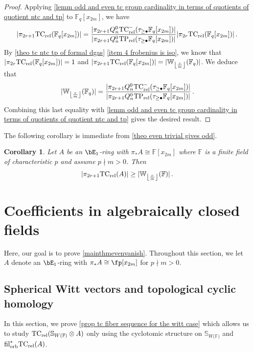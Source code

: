 \documentclass[english,10pt]{amsart}
\newcommand{\sphwf}{\mathbb{S}_{W(\mathbb{F)}}}
\newcommand{\rel}{\textup{rel}}
\newcommand{\field}{\mathbb{F}}
\newtheorem{coro}{Corollary}[section]
\theoremstyle{definition}
\numberwithin{equation}{section}
\newcommand{\rntc}{\mathrm{TC}_{\rel}^{-}}
\newcommand{\rtp}{\mathrm{TP}_{\rel}}
\newcommand{\rtc}{\mathrm{TC}_{\rel}}
\newcommand{\filorb}{\mathrm{fil}^{*}_{\textup{orb}}}
\newcommand{\pis}{\pi_*}
\DeclarePairedDelimiter\floor{\lfloor}{\rfloor}
\begin{document}
\theoeventrivialgivesodd*

\begin{proof}

 Applying \autoref{lemm odd and even tc group cardinality in terms of quotients of quotient ntc and tp} to $\field_{q}[x_{2m}]$, we have 
\[\lvert \pi_{2r+1}\rtc (\field_q[x_{2m}]) \rvert = \frac{\lvert \pi_{2r+1} Q_n^0 \rntc(\tau_{\geq \bullet} \field_q[x_{2m}]) \rvert}{\lvert \pi_{2r+1} Q_n^0 \rtp(\tau_{\geq \bullet} \field_q[x_{2m}]) \rvert} \lvert \pi_{2r} \rtc (\field_q[x_{2m}])\rvert \,.\]
By \autoref{theo tc ntc tp of formal dgas} \eqref{item 4 frobenius is iso}, we know that $\lvert \pi_{2r} \rtc (\field_q[x_{2m}])\rvert = 1$ and $\lvert \pi_{2r+ 1}\rtc (\field_q[x_{2m}]) \rvert  = \lvert \mathbb{W}_{\floor*{\frac{r}{m}}}(\field_q)\rvert$. We deduce that 
\[ \lvert \mathbb{W}_{\floor*{\frac{r}{m}}}(\field_q)\rvert=\frac{\lvert \pi_{2r+1} Q_n^0 \rntc(\tau_{\geq \bullet} \field_q[x_{2m}]) \rvert}{\lvert \pi_{2r+1} Q_n^0 \rtp(\tau_{\geq \bullet} \field_q[x_{2m}]) \rvert}\,.\]
Combining this last equality with \autoref{lemm odd and even tc group cardinality in terms of quotients of quotient ntc and tp} gives the desired result.

\end{proof}
The following corollary is immediate from \autoref{theo even trivial gives odd}.  
\begin{coro}
Let $A$ be an $\bE_1$-ring with $\pis A \cong \field[x_{2m}]$ where $\field$ is a finite field of characteristic $p$ and assume $p \nmid m>0$. Then 
\[ \lvert \pi_{2r+1}\rtc(A)\rvert \ge  \lvert \mathbb{W}_{\floor*{\frac{r}{m}}}(\field) \rvert  \,.
\]
\end{coro}

\section{Coefficients in algebraically closed fields}

Here, our goal is to prove \autoref{mainthmevenvanish}. Throughout this section, we let  $A$ denote an $\bE_1$-ring with $\pis A \cong \fp[x_{2m}]$ for  $p\nmid m>0$. 


\subsection{Spherical Witt vectors and topological cyclic homology}
In this section, we prove \autoref{prop tc fiber sequence for the witt case} which allows us to study $\rtc(\sphwf\otimes A)$ only using the cyclotomic structure on $\sphwf$ and $\filorb \rtc(A)$.
\end{document}
